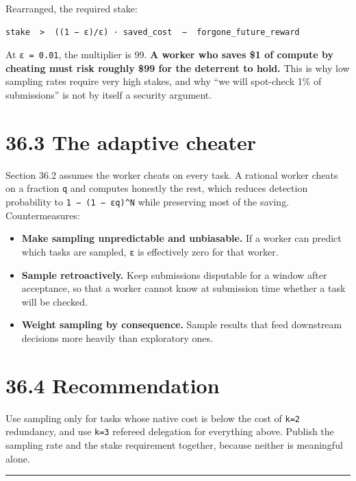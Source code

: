 \documentclass[
  11pt]{report}
\providecommand{\tightlist}{%
  \setlength{\itemsep}{0pt}\setlength{\parskip}{0pt}}
\begin{document}
Rearranged, the required stake:

\begin{verbatim}
stake  >  ((1 − ε)/ε) · saved_cost  −  forgone_future_reward
\end{verbatim}

At \texttt{ε\ =\ 0.01}, the multiplier is 99. \textbf{A worker who saves
\$1 of compute by cheating must risk roughly \$99 for the deterrent to
hold.} This is why low sampling rates require very high stakes, and why
``we will spot-check 1\% of submissions'' is not by itself a security
argument.

\hypertarget{the-adaptive-cheater}{%
\section{36.3 The adaptive cheater}\label{the-adaptive-cheater}}

Section 36.2 assumes the worker cheats on every task. A rational worker
cheats on a fraction \texttt{q} and computes honestly the rest, which
reduces detection probability to \texttt{1\ −\ (1\ −\ εq)\^{}N} while
preserving most of the saving. Countermeasures:

\begin{itemize}
\tightlist
\item
  \textbf{Make sampling unpredictable and unbiasable.} If a worker can
  predict which tasks are sampled, \texttt{ε} is effectively zero for
  that worker.
\item
  \textbf{Sample retroactively.} Keep submissions disputable for a
  window after acceptance, so that a worker cannot know at submission
  time whether a task will be checked.
\item
  \textbf{Weight sampling by consequence.} Sample results that feed
  downstream decisions more heavily than exploratory ones.
\end{itemize}

\hypertarget{recommendation-1}{%
\section{36.4 Recommendation}\label{recommendation-1}}

Use sampling only for tasks whose native cost is below the cost of
\texttt{k=2} redundancy, and use \texttt{k=3} refereed delegation for
everything above. Publish the sampling rate and the stake requirement
together, because neither is meaningful alone.

\begin{center}\rule{0.5\linewidth}{0.5pt}\end{center}
\end{document}

